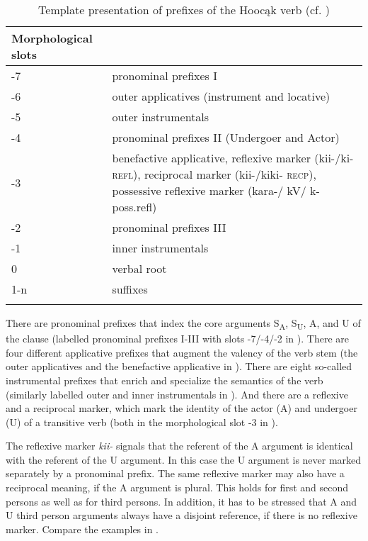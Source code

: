 \documentclass[output=paper]{langscibook}
\begin{document}
\begin{table}[H]
	\begin{tabular}{p{3cm} p{9cm}}
		\lsptoprule
		Morphological slots   & \\
		\hline 
	 -7	& pronominal prefixes I \\
	-6	& outer applicatives (instrument and locative) \\
	-5	& outer instrumentals \\
	-4	& pronominal prefixes II (Undergoer and Actor)  \\
	-3	&benefactive applicative, reflexive marker (kii-/ki- \textsc{refl}), reciprocal marker (kii-/kiki- \textsc{recp}), possessive reflexive marker (kara-/ kV/ k- poss.refl) \\
	-2	& pronominal prefixes III   \\
	-1	& inner instrumentals \\
	0	& verbal root \\
	1-n	& suffixes  \\
	\lspbottomrule 
	\end{tabular}
	\caption{Template presentation of prefixes of the Hoocąk verb (cf. \citealt{Helmbrecht2008})}\label{tab:Helmbrecht:1}
\end{table}


There are pronominal prefixes that index the core arguments S\textsubscript{A}, S\textsubscript{U}, A, and U of the clause (labelled pronominal prefixes I-III with slots -7/-4/-2 in ). There are four different applicative prefixes that augment the valency of the verb stem (the outer applicatives and the benefactive applicative in ). There are eight so-called instrumental prefixes that enrich and specialize the semantics of the verb (similarly labelled outer and inner instrumentals in ). And there are a reflexive and a reciprocal marker, which mark the identity of the actor (A) and undergoer (U) of a transitive verb (both in the morphological slot -3 in ). 

The reflexive marker \textit{kii-} signals that the referent of the A argument is identical with the referent of the U argument. In this case the U argument is never marked separately by a pronominal prefix. The same reflexive marker may also have a reciprocal meaning, if the A argument is plural. This holds for first and second persons as well as for third persons. In addition, it has to be stressed that A and U third person arguments always have a disjoint reference, if there is no reflexive marker. Compare the examples in .
\end{document}

